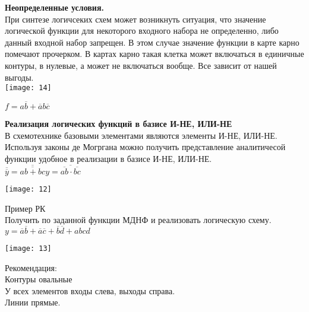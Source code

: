 \Large{ \textbf { Неопределенные условия.}}\\
При синтезе логичсеких схем может возникнуть ситуация, что значение логической функции для некоторого входного набора не определенно,
либо данный входной набор запрещен.
В этом случае значение функции в карте карно помечают прочерком.
В картах карно такая клетка может включаться в единичные контуры, в нулевые, а может не включаться вообще.
Все зависит от нашей выгоды.\\
\texttt{[image: 14]}

$
f = a\overline{b} + \overline{a}b\overline{c}
$



\Large{ \textbf { Реализация логических функций в базисе И-НЕ, ИЛИ-НЕ}}\\
В схемотехнике базовыми элементами являются элементы И-НЕ, ИЛИ-НЕ.
Используя законы де Могргана можно получить представление аналитичесой функции удобное в реализации в базисе И-НЕ, ИЛИ-НЕ.\\
$
\overline{\overline{y}} = \overline{\overline{ab + bc}}
y = \overline{\overline{ab} \cdot \overline{bc}}
$

\texttt{[image: 12]}

Пример РК\\
Получить по заданной функции МДНФ и реализовать логическую схему.\\
$
y = \overline{a}\overline{b} + \overline{a}\overline{c} +\overline{b} \overline{d} + abcd
$

\texttt{[image: 13]}

Рекомендация: \\
Контуры овальные\\
У всех элементов входы слева, выходы справа.\\
Линии прямые. \\
